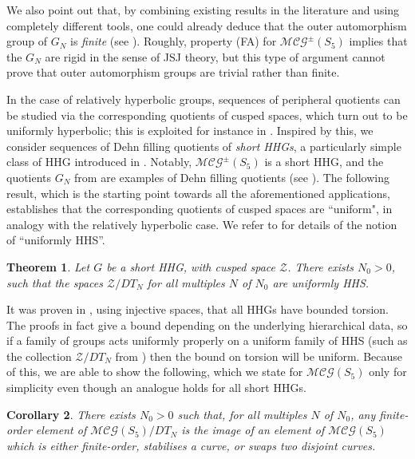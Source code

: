 \documentclass[svgnames]{amsart}
\theoremstyle{plain}
\newtheorem{thmintro}{Theorem}
\newtheorem{corintro}[thmintro]{Corollary}
\theoremstyle{definition}
\newcommand{\MCG}{\mathcal{MCG}}
\begin{document}
We also point out that, by combining existing results in the literature and using completely different tools, one could already deduce that the outer automorphism group of $G_N$ is \emph{finite} (see ). Roughly, property (FA) for $\MCG^\pm(S_5)$ implies that the $G_N$ are rigid in the sense of JSJ theory, but this type of argument cannot prove that outer automorphism groups are trivial rather than finite.

In the case of relatively hyperbolic groups, sequences of peripheral quotients can be studied via the corresponding quotients of cusped spaces, which turn out to be uniformly hyperbolic; this is exploited for instance in \cite{dahmaniguirardel}. Inspired by this, we consider sequences of Dehn filling quotients of \emph{short HHGs}, a particularly simple class of HHG introduced in \cite{short_HHG:I}. Notably, $\MCG^\pm(S_5)$ is a short HHG, and the quotients $G_N$ from  are examples of Dehn filling quotients (see ). The following result, which is the starting point towards all the aforementioned applications, establishes that the corresponding quotients of cusped spaces are ``uniform", in analogy with the relatively hyperbolic case. We refer to  for details of the notion of ``uniformly HHS''. 

\begin{thmintro}\label{thmintro:uniform}
    Let $G$ be a short HHG, with cusped space $\mathcal Z$. There exists $N_0>0$, such that the spaces $\mathcal Z/DT_N$ for all multiples $N$ of $N_0$ are uniformly HHS.
\end{thmintro}

\noindent It was proven in \cite{HHP:coarse}, using injective spaces, that all HHGs have bounded torsion. The proofs in fact give a bound depending on the underlying hierarchical data, so if a family of groups acts uniformly properly on a uniform family of HHS (such as the collection $\mathcal Z/DT_N$ from ) then the bound on torsion will be uniform. Because of this, we are able to show the following, which we state for $\MCG(S_5)$ only for simplicity even though an analogue holds for all short HHGs.

\begin{corintro}
\label{corintro:torsion-in-quotients}
    There exists $N_0>0$ such that, for all multiples $N$ of $N_0$, any finite-order element of $\MCG(S_5)/DT_N$ is the image of an element of $\MCG(S_5)$ which is either finite-order, stabilises a curve, or swaps two disjoint curves.
\end{corintro}
\end{document}
